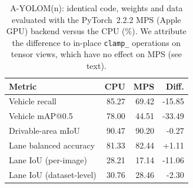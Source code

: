 \begin{table}[t]
\centering
\caption{A-YOLOM(n): identical code, weights and data evaluated with the PyTorch~2.2.2 MPS (Apple GPU) backend versus the CPU (\%). We attribute the difference to in-place \texttt{clamp\_} operations on tensor views, which have no effect on MPS (see text).}
\label{tab:mps}
\small
\begin{tabular}{l rrr}
\toprule
Metric & CPU & MPS & Diff. \\
\midrule
Vehicle recall & 85.27 & 69.42 & -15.85 \\
Vehicle mAP@0.5 & 78.00 & 44.51 & -33.49 \\
Drivable-area mIoU & 90.47 & 90.20 & -0.27 \\
Lane balanced accuracy & 81.33 & 82.44 & +1.11 \\
Lane IoU (per-image) & 28.21 & 17.14 & -11.06 \\
Lane IoU (dataset-level) & 30.76 & 28.46 & -2.30 \\
\bottomrule
\end{tabular}
\end{table}
